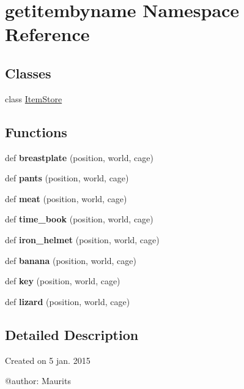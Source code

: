 \hypertarget{namespacegetitembyname}{}\section{getitembyname Namespace Reference}
\label{namespacegetitembyname}
\subsection*{Classes}
\begin{DoxyCompactItemize}
\item 
class \hyperlink{classgetitembyname_1_1_item_store}{Item\+Store}
\end{DoxyCompactItemize}
\subsection*{Functions}
\begin{DoxyCompactItemize}
\item 
\hypertarget{namespacegetitembyname_a8b4ce42ac7d0b5090203b0ac685c2c1b}{}def {\bfseries breastplate} (position, world, cage)\label{namespacegetitembyname_a8b4ce42ac7d0b5090203b0ac685c2c1b}

\item 
\hypertarget{namespacegetitembyname_a1f904bdf3eb721d5a31858b4c8faae29}{}def {\bfseries pants} (position, world, cage)\label{namespacegetitembyname_a1f904bdf3eb721d5a31858b4c8faae29}

\item 
\hypertarget{namespacegetitembyname_a0ef03150406af4cc5163fff6f775df96}{}def {\bfseries meat} (position, world, cage)\label{namespacegetitembyname_a0ef03150406af4cc5163fff6f775df96}

\item 
\hypertarget{namespacegetitembyname_a20d84d2b0caaa1b597145254749db05b}{}def {\bfseries time\+\_\+book} (position, world, cage)\label{namespacegetitembyname_a20d84d2b0caaa1b597145254749db05b}

\item 
\hypertarget{namespacegetitembyname_abf18054af6864b58672540c6daa78c7e}{}def {\bfseries iron\+\_\+helmet} (position, world, cage)\label{namespacegetitembyname_abf18054af6864b58672540c6daa78c7e}

\item 
\hypertarget{namespacegetitembyname_abeb07e855cfb064ea0489507ea3648ef}{}def {\bfseries banana} (position, world, cage)\label{namespacegetitembyname_abeb07e855cfb064ea0489507ea3648ef}

\item 
\hypertarget{namespacegetitembyname_a28d22e9e39148915d1a85f0e0b30da91}{}def {\bfseries key} (position, world, cage)\label{namespacegetitembyname_a28d22e9e39148915d1a85f0e0b30da91}

\item 
\hypertarget{namespacegetitembyname_a311084742718d41d4b4959353b0ed152}{}def {\bfseries lizard} (position, world, cage)\label{namespacegetitembyname_a311084742718d41d4b4959353b0ed152}

\end{DoxyCompactItemize}


\subsection{Detailed Description}
\begin{DoxyVerb}Created on 5 jan. 2015

@author: Maurits
\end{DoxyVerb}
 